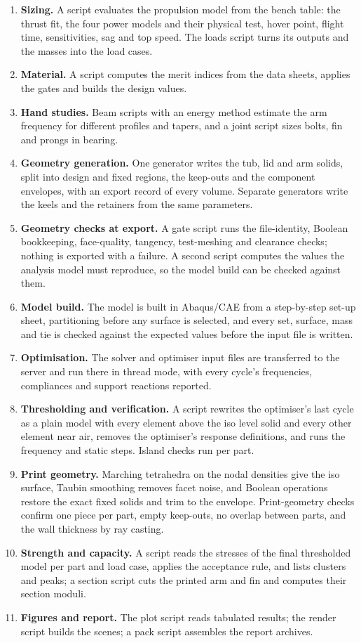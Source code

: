 \begin{enumerate}
\item \textbf{Sizing.} A script evaluates the propulsion model from the bench table: the thrust fit, the four power models and their physical test, hover point, flight time, sensitivities, sag and top speed. The loads script turns its outputs and the masses into the load cases.
\item \textbf{Material.} A script computes the merit indices from the data sheets, applies the gates and builds the design values.
\item \textbf{Hand studies.} Beam scripts with an energy method estimate the arm frequency for different profiles and tapers, and a joint script sizes bolts, fin and prongs in bearing.
\item \textbf{Geometry generation.} One generator writes the tub, lid and arm solids, split into design and fixed regions, the keep-outs and the component envelopes, with an export record of every volume. Separate generators write the keels and the retainers from the same parameters.
\item \textbf{Geometry checks at export.} A gate script runs the file-identity, Boolean bookkeeping, face-quality, tangency, test-meshing and clearance checks; nothing is exported with a failure. A second script computes the values the analysis model must reproduce, so the model build can be checked against them.
\item \textbf{Model build.} The model is built in Abaqus/CAE from a step-by-step set-up sheet, partitioning before any surface is selected, and every set, surface, mass and tie is checked against the expected values before the input file is written.
\item \textbf{Optimisation.} The solver and optimiser input files are transferred to the server and run there in thread mode, with every cycle's frequencies, compliances and support reactions reported.
\item \textbf{Thresholding and verification.} A script rewrites the optimiser's last cycle as a plain model with every element above the iso level solid and every other element near air, removes the optimiser's response definitions, and runs the frequency and static steps. Island checks run per part.
\item \textbf{Print geometry.} Marching tetrahedra on the nodal densities give the iso surface, Taubin smoothing removes facet noise, and Boolean operations restore the exact fixed solids and trim to the envelope. Print-geometry checks confirm one piece per part, empty keep-outs, no overlap between parts, and the wall thickness by ray casting.
\item \textbf{Strength and capacity.} A script reads the stresses of the final thresholded model per part and load case, applies the acceptance rule, and lists clusters and peaks; a section script cuts the printed arm and fin and computes their section moduli.
\item \textbf{Figures and report.} The plot script reads tabulated results; the render script builds the scenes; a pack script assembles the report archives.
\end{enumerate}

